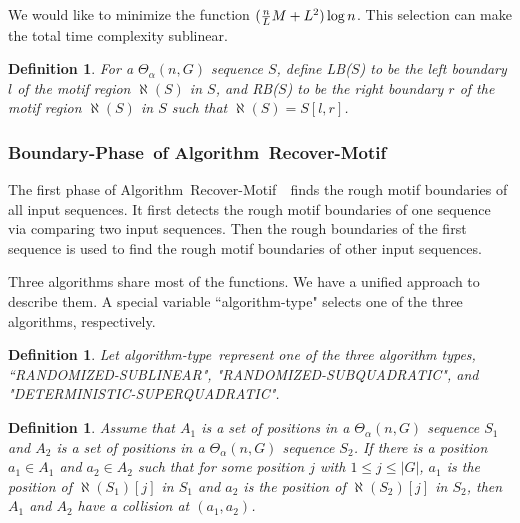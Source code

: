 \documentclass[11pt]{article}
\newtheorem{dfntn}[theoremfoo]{Definition}
\newenvironment{definition}{\pagebreak[1]\begin{dfntn}\rm}{\end{dfntn}}
\newcommand{\algmnam}{Recover-Motif}
\newcommand{\algmname}{Algorithm~\algmnam}
\newcommand{\algma}{\algmname~}
\newcommand{\phaseone}{Boundary-Phase}
\newcommand{\LB}{{\rm LB}}
\newcommand{\RB}{{\rm RB}}
\newcommand{\algtype}{{\rm algorithm-type}}
\newcommand{\sublinear}{{\rm RANDOMIZED-SUBLINEAR}}
\newcommand{\randomized}{{\rm RANDOMIZED-SUBQUADRATIC}}
\newcommand{\deterministic}{{\rm DETERMINISTIC-SUPERQUADRATIC}}
\begin{document}
We would like to
minimize the function $({n\over L}M+L^2)\log n$. This selection can
make the total time complexity sublinear.





















\begin{definition}
For a $\Theta_{\alpha}(n,G)$ sequence $S$, define \LB($S$) to be the
left boundary $l$ of the motif region $\aleph(S)$ in $S$, and
\RB($S$) to be the right boundary $r$ of the motif region
$\aleph(S)$ in $S$ such that $\aleph(S)=S[l,r]$.
\end{definition}



\subsubsection{\phaseone~of \algma}
 The first phase of \algma~finds the rough motif boundaries of all
input sequences. It first detects the rough motif boundaries of one
sequence via comparing two input sequences. Then the rough
boundaries of the first sequence is used to find the rough motif
boundaries of other input sequences.


Three algorithms share most of the functions. We have a unified
approach to describe them. A special variable ``\algtype" selects
one of the three algorithms, respectively.

\begin{definition}
Let \algtype~represent one of the three algorithm types,
``\sublinear", "\randomized", and "\deterministic".
\end{definition}


\begin{definition}
Assume that $A_1$ is a set of positions in a $\Theta_{\alpha}(n,G)$
sequence $S_1$ and $A_2$ is a set of positions in a
$\Theta_{\alpha}(n,G)$ sequence $S_2$. If there is a position
$a_1\in A_1$ and $a_2\in A_2$ such that for some position $j$ with
$1\le j\le |G|$, $a_1$ is the position of $\aleph(S_1)[j]$ in $S_1$
and $a_2$ is the position of $\aleph(S_2)[j]$ in $S_2$, then $A_1$
and $A_2$ have a {\it collision} at $(a_1,a_2)$.
\end{definition}
\end{document}
